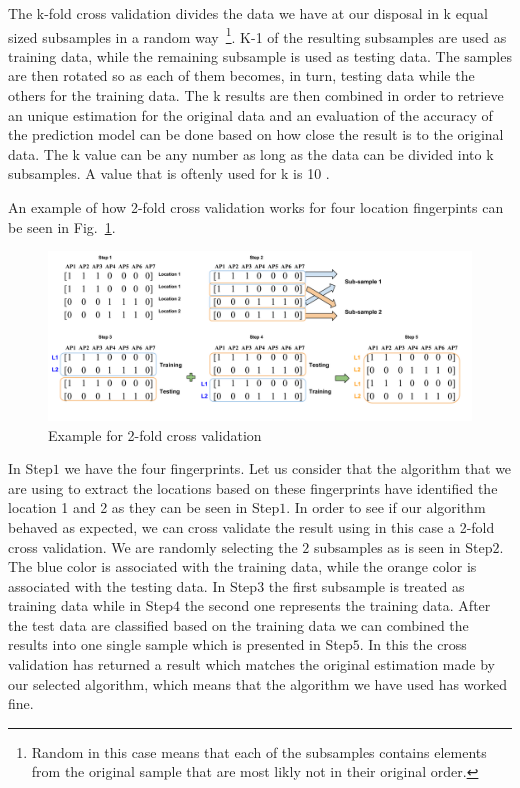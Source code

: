 The k-fold cross validation divides the data we have at our disposal in k equal
sized subsamples in a random way~\footnote{Random in this case means that
each of the subsamples contains elements from the original sample that are
most likly not in their original order.}. K-1 of the resulting subsamples are
used as training data, while the remaining subsample is used as testing data.
The samples are then rotated so as each of them becomes, in turn, testing
data while the others for the training data. The k results are then combined in
order to retrieve an unique estimation for the original data and an evaluation
of the accuracy of the prediction model can be done based on how close the
result is to the original data. The k value can be any number as long as the
data can be divided into k subsamples. A value that is oftenly used for k is 10
\cite{mclachlan2005analyzing}.

An example of how 2-fold cross validation works for four location fingerpints
can be seen in Fig.~\ref{2foldvalid}.

\begin{figure}[!h]
\centering
\includegraphics[width=\textwidth]{figures/kmeans/2-fold-validation.png}
\caption{Example for 2-fold cross validation}
\label{2foldvalid}
\end{figure}

In Step$1$ we have the four fingerprints. Let us consider that the algorithm
that we are using to extract the locations based on these fingerprints have
identified the location 1 and 2 as they can be seen in Step$1$. In order to see
if our algorithm behaved as expected, we can cross validate the result using in
this case a 2-fold cross validation. We are randomly selecting the $2$
subsamples as is seen in Step$2$. The blue color is associated with the training
data, while the orange color is associated with the testing data. In Step$3$ the
first subsample is treated as training data while in Step$4$ the second one
represents the training data. After the test data are classified based on the
training data we can combined the results into one single sample which is
presented in Step$5$. In this the cross validation has returned a result which
matches the original estimation made by our selected algorithm, which means that
the algorithm we have used has worked fine.

